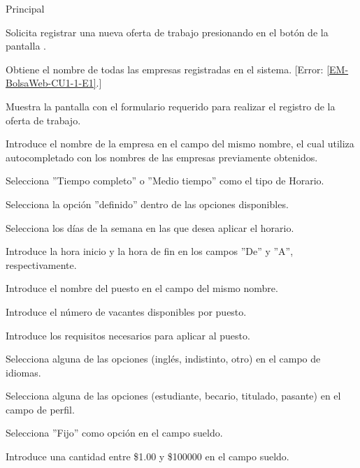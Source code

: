 	\begin{UCtrayectoria}{Principal}

		\UCpaso [\UCactor] Solicita registrar una nueva oferta de trabajo presionando en el botón  de la pantalla .

		\UCpaso Obtiene el nombre de todas las empresas registradas en el sistema. [Error: \ref{EM-BolsaWeb-CU1-1-E1}.]

		\UCpaso Muestra la pantalla  con el formulario requerido para realizar el registro de la oferta de trabajo.

		\UCpaso [\UCactor] Introduce el nombre de la empresa en el campo del mismo nombre, el cual utiliza autocompletado con los nombres de las empresas previamente obtenidos. \label{l_EM_BolsaWeb_CU1_1_InicioFormulario}

		\UCpaso [\UCactor] Selecciona ''Tiempo completo'' o ''Medio tiempo'' como el tipo de Horario.   

		\UCpaso [\UCactor] Selecciona la opción ''definido'' dentro de las opciones disponibles.  

		\UCpaso [\UCactor] Selecciona los días de la semana en las que desea aplicar el horario.

		\UCpaso [\UCactor] Introduce la hora inicio y la hora de fin en los campos ''De'' y ''A'', respectivamente. 

		\UCpaso [\UCactor] Introduce el nombre del puesto en el campo del mismo nombre. \label{l_EM_BolsaWeb_CU1_1_NombrePuesto}

		\UCpaso [\UCactor] Introduce el número de vacantes disponibles por puesto.

		\UCpaso [\UCactor] Introduce los requisitos necesarios para aplicar al puesto.

		\UCpaso [\UCactor] Selecciona alguna de las opciones (inglés, indistinto, otro) en el campo de idiomas.

		\UCpaso [\UCactor] Selecciona alguna de las opciones (estudiante, becario, titulado, pasante) en el campo de perfil.

		\UCpaso [\UCactor] Selecciona ''Fijo'' como opción en el campo sueldo.  
 
		\UCpaso [\UCactor] Introduce una cantidad entre \$1.00 y \$100000 en el campo sueldo.


\end{UCtrayectoria}
